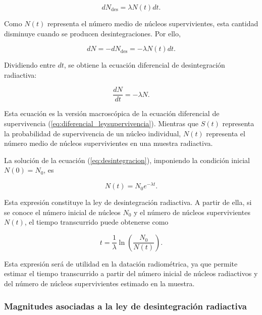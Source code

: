 \documentclass[12pt,a4paper]{article}
\begin{document}
\begin{equation}
    dN_{\text{des}}=\lambda N(t)dt.
\end{equation}

Como $N(t)$ representa el número medio de núcleos supervivientes, esta cantidad disminuye cuando se producen desintegraciones. Por ello,

\begin{equation}
    dN=-dN_{\text{des}}=-\lambda N(t)dt.
\end{equation}

Dividiendo entre $dt$, se obtiene la ecuación diferencial de desintegración radiactiva:

\begin{equation}
    \frac{dN}{dt}=-\lambda N.
    \label{eq:desintegracion}
\end{equation}

Esta ecuación es la versión macroscópica de la ecuación diferencial de supervivencia (\ref{eq:diferencial_leysupervivencia}). Mientras que $S(t)$ representa la probabilidad de supervivencia de un núcleo individual, $N(t)$ representa el número medio de núcleos supervivientes en una muestra radiactiva.

La solución de la ecuación (\ref{eq:desintegracion}), imponiendo la condición inicial $N(0)=N_0$, es

\begin{equation}
    N(t)=N_0 e^{-\lambda t}.
    \label{eq:ley_desintegracion}
\end{equation}

Esta expresión constituye la ley de desintegración radiactiva. A partir de ella, si se conoce el número inicial de núcleos $N_0$ y el número de núcleos supervivientes $N(t)$, el tiempo transcurrido puede obtenerse como

\begin{equation}
    t=\frac{1}{\lambda}\ln\left(\frac{N_0}{N(t)}\right).
    \label{eq:tiempo_desintegracion}
\end{equation}

Esta expresión será de utilidad en la datación radiométrica, ya que permite estimar el tiempo transcurrido a partir del número inicial de núcleos radiactivos y del número de núcleos supervivientes estimado en la muestra.

\subsubsection{Magnitudes asociadas a la ley de desintegración radiactiva}
\end{document}
